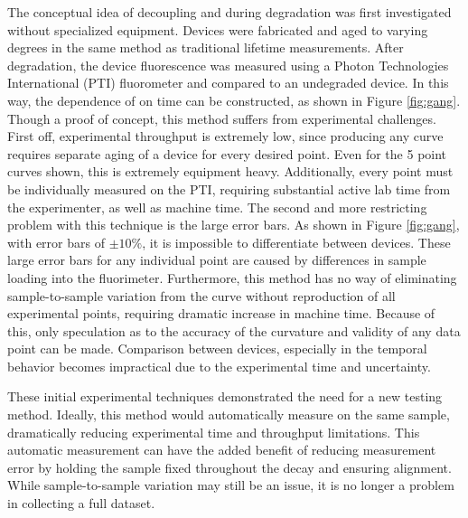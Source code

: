 \documentclass[../thesis.tex]{subfiles}
\begin{document}
The conceptual idea of decoupling \ef and \pl during degradation was first investigated  without specialized equipment.
Devices were fabricated and aged to varying degrees in the same method as traditional lifetime measurements.
After degradation, the device fluorescence was measured using a Photon Technologies International (PTI) fluorometer and compared to an undegraded device.
In this way, the dependence of \pl on time can be constructed, as shown in Figure \ref{fig:gang}.
Though a proof of concept, this method suffers from experimental challenges.
First off, experimental throughput is extremely low, since producing any \pl curve requires separate aging of a device for every desired point.  
Even for the 5 point curves shown, this is extremely equipment heavy.
Additionally, every point must be individually measured on the PTI, requiring substantial active lab time from the experimenter, as well as machine time.
The second and more restricting problem with this technique is the large error bars.  
As shown in Figure \ref{fig:gang}, with error bars of $\pm 10\%$, it is impossible to differentiate between devices.
These large error bars for any individual point are caused by differences in sample loading into the fluorimeter.  
Furthermore, this method has no way of eliminating sample-to-sample variation from the \pl curve without reproduction of all experimental points, requiring dramatic increase in machine time.
Because of this, only speculation as to the accuracy of the curvature and validity of any data point can be made.
Comparison between devices, especially in the temporal behavior becomes impractical due to the experimental time and uncertainty.

These initial experimental techniques demonstrated the need for a new testing method.
Ideally, this method would automatically measure \pl on the same sample, dramatically reducing experimental time and throughput limitations.
This automatic measurement can have the added benefit of reducing measurement error by holding the sample fixed throughout the decay and ensuring alignment.
While sample-to-sample variation may still be an issue, it is no longer a problem in collecting a full dataset.
\end{document}
